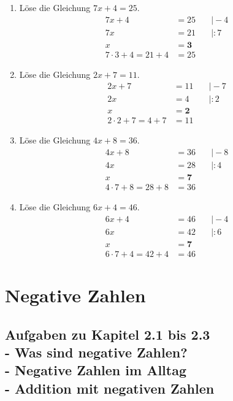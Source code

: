 \documentclass[a4paper,10pt]{article} %
\begin{document}
\begin{enumerate}
  \item Löse die Gleichung \(7x + 4 = 25\).
  \[
  \begin{aligned}
    7x + 4 &= 25 &\quad\big| - 4 \\
    7x &= 21 &\quad\big| : 7 \\
    x &= \mathbf{3} \\
    7 \cdot 3 + 4 = 21 + 4 &= 25
  \end{aligned}
  \]

  \item Löse die Gleichung \(2x + 7 = 11\).
  \[
  \begin{aligned}
    2x + 7 &= 11 &\quad\big| - 7 \\
    2x &= 4 &\quad\big| : 2 \\
    x &= \mathbf{2} \\
    2 \cdot 2 + 7 = 4 + 7 &= 11
  \end{aligned}
  \]

  \item Löse die Gleichung \(4x + 8 = 36\).
  \[
  \begin{aligned}
    4x + 8 &= 36 &\quad\big| - 8 \\
    4x &= 28 &\quad\big| : 4 \\
    x &= \mathbf{7} \\
    4 \cdot 7 + 8 = 28 + 8 &= 36
  \end{aligned}
  \]

  \item Löse die Gleichung \(6x + 4 = 46\).
  \[
  \begin{aligned}
    6x + 4 &= 46 &\quad\big| - 4 \\
    6x &= 42 &\quad\big| : 6 \\
    x &= \mathbf{7} \\
    6 \cdot 7 + 4 = 42 + 4 &= 46
  \end{aligned}
  \]

\end{enumerate}

\section{Negative Zahlen}

\subsection{Aufgaben zu Kapitel 2.1 bis 2.3 \\
  - Was sind negative Zahlen? \\
  - Negative Zahlen im Alltag \\
  - Addition mit negativen Zahlen}
\end{document}
